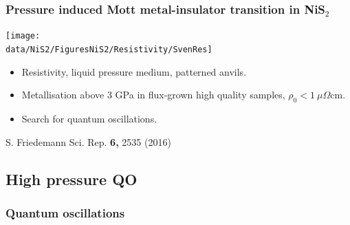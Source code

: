 \begin{frame}[label=NiS2-1]
\frametitle{Pressure induced Mott metal-insulator transition in NiS$_2$}
\centerline{\texttt{[image: \\data/NiS2/FiguresNiS2/Resistivity/SvenRes]}}
\begin{itemize}
\item
Resistivity, liquid pressure medium, patterned anvils.

\item
Metallisation above 3 GPa in flux-grown high quality samples,
$\rho_0 < 1~\mu \Omega \mathrm {cm}$.

\item 
Search for quantum oscillations.

\end{itemize}
\vspace*{\fill}
\vspace{-0.25em}
\centerline{\makebox[\linewidth]{\rule{0.85\textwidth}{0.4pt}}}
\centerline{\scriptsize S. Friedemann Sci. Rep. {\bf 6,} 2535 (2016)}
\end{frame}

\subsection{High pressure QO}
\begin{frame}[label=QuantOsc]
\frametitle{Quantum oscillations}




\end{frame}

